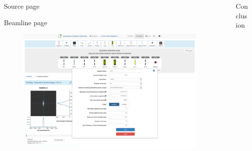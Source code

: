 \documentclass[final]{beamer}
\newlength{\sepwid}
\newlength{\onecolwid}
\newlength{\twocolwid}
\begin{document}
\begin{frame}[t]
\begin{columns}[t]
\begin{column}{\twocolwid}
\begin{block}{\faLightbulbO{} Source page}
\end{block} 

\vspace{-1.0cm}

\begin{block}{\faSignOut{} \faEllipsisH{} \faBullseye{} Beamline page}

\begin{figure}
\includegraphics[width=1.0\linewidth]{images/beamline_page.png}
\end{figure}

\end{block}



\end{column} %

\begin{column}{\sepwid}\end{column} %

\begin{column}{\onecolwid} %


\begin{block}{\faFlag{} Conclusion}


\end{block}
\end{column}
\end{columns}
\end{frame}
\end{document}
